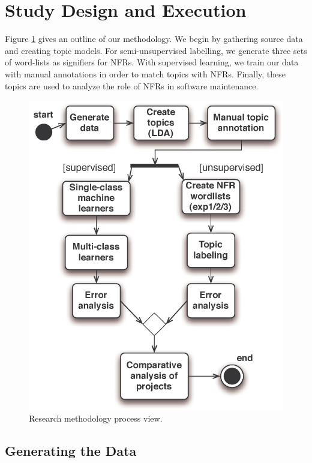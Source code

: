 \documentclass[smallextended]{svjour3}       %
\begin{document}
\section{Study Design and Execution}
Figure \ref{fig:process} gives an outline of our methodology.
We begin by gathering source data and creating topic models. For semi-unsupervised labelling, we generate three sets of word-lists as signifiers for NFRs.
With supervised learning, we train our data with manual annotations in order to match topics with NFRs. Finally, these topics are used to analyze the
role of NFRs in software maintenance.

\begin{figure}
  \centering
 \includegraphics[height=.6\textheight]{figures/process-model}
 \caption{Research methodology process view.}
  \label{fig:process}
\end{figure}

\subsection{Generating the Data}
\label{sec:wordlist}
\end{document}
